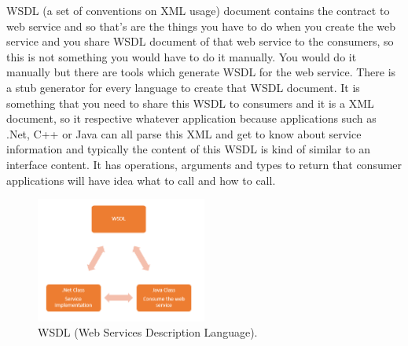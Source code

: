 WSDL (a set of conventions on XML usage) document contains the contract to web service and so that’s are the things you have to do when you create the web service and you share WSDL document of that web service to the consumers, so this is not something you would have to do it manually. You would do it manually but there are tools which generate WSDL for the web service. There is a stub generator for every language to create that WSDL document. It is something that you need to share this WSDL to consumers and it is a XML document, so it respective whatever application because applications such as .Net, C++ or Java can all parse this XML\citep{thesis:state4} and get to know about service information and typically the content of this WSDL is kind of similar to an interface content. It has operations, arguments and types  to return that consumer applications will have idea what to call and how to call.

\begin{figure}[!htb]
  \centering
  \includegraphics[width=0.5\textwidth]{Figures/WSDL.png}
  \caption[WSDL (Web Services Description Language).]{WSDL (Web Services Description Language).}
  \label{fig:wsdl}
\end{figure}

